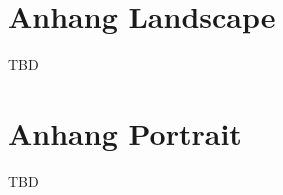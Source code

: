 \appendix
\uselandscape
	\chapter{Anhang Landscape} \label{apx:landscape}
	TBD

\useportrait
\chapter{Anhang Portrait} \label{apx:portrait}
TBD